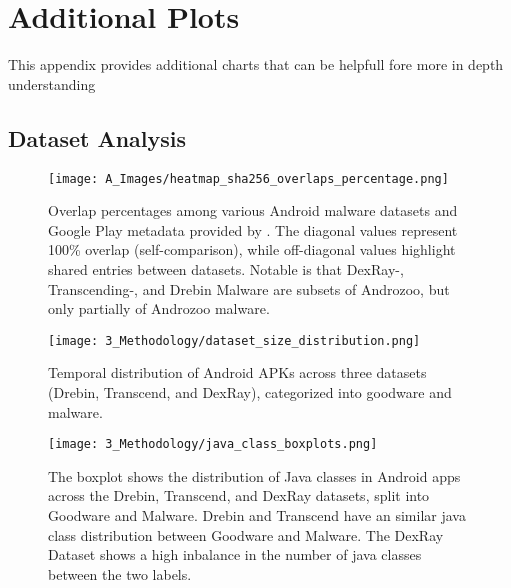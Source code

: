  
\chapter{Additional Plots}
\label{appendiximages}
\label{appendix-more-details-on-template}

This appendix provides additional charts that can be helpfull fore more in depth understanding

\section{Dataset Analysis}\label{AppendixDatasetAnalysis}

\begin{figure*}[htb]
    \centering
    \begin{minipage}{1.5\textwidth}
        \centering
        \texttt{[image: A\_Images/heatmap\_sha256\_overlaps\_percentage.png]}
        \captionsetup{width=\textwidth}
        \caption{\label{fig:dataset_overlap}
        Overlap percentages among various Android malware datasets and Google Play metadata provided by \cite{gp_metadata}. 
        The diagonal values represent 100\% overlap (self-comparison), 
        while off-diagonal values highlight shared entries between datasets.
        Notable is that DexRay-, Transcending-, and Drebin Malware are subsets of Androzoo,
        but only partially of Androzoo malware.
        }
    \end{minipage}
\end{figure*}

\newpage

\begin{figure*}[h]
    \centering
    \texttt{[image: 3\_Methodology/dataset\_size\_distribution.png]}
    \caption{\label{fig:dataset_size_evaluation}
    Temporal distribution of Android APKs across three datasets (Drebin, Transcend, and DexRay), 
    categorized into goodware and malware.}
\end{figure*}



\begin{figure*}[b!]
    \centering
    \begin{minipage}{1.5\textwidth}
        \centering
        \texttt{[image: 3\_Methodology/java\_class\_boxplots.png]}
        \captionsetup{width=\textwidth}
        \caption{\label{fig:java_class_boxplots}
        The boxplot shows the distribution of Java classes in Android apps 
        across the Drebin, Transcend, and DexRay datasets, 
        split into Goodware and Malware. 
        Drebin and Transcend have an similar java class distribution 
        between Goodware and Malware.
        The DexRay Dataset shows a high inbalance in the number of java classes 
        between the two labels.
        }
    \end{minipage}
\end{figure*}




